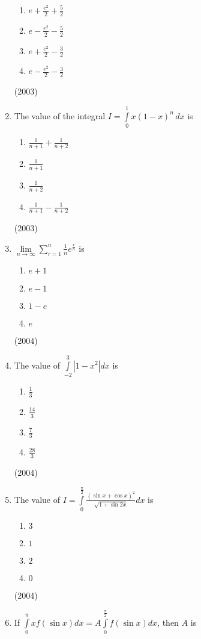 \documentclass[journal,12pt,twocolumn]{IEEEtran}
\theoremstyle{remark}
\begin{document}
\begin{enumerate}
			\begin {enumerate}
				\item $e+ \frac{e^2}{2} + \frac{5}{2}$
				\item $e- \frac{e^2}{2} - \frac{5}{2}$
				\item $e+ \frac{e^2}{2} - \frac{3}{2}$
				\item $e- \frac{e^2}{2} - \frac{3}{2}$
			\end {enumerate}
			\hfill (2003)
	\item
		The value of the integral $I = \int \limits_0^1 x(1-x)^n \, dx$ is
			\begin{enumerate}
				\item $\frac{1}{n+1} + \frac{1}{n+2}$
				\item $\frac{1}{n+1}$
				\item $\frac{1}{n+2}$
				\item $\frac{1}{n+1} - \frac{1}{n+2}$
			\end{enumerate}
			\hfill (2003)
	\item
		$\lim \limits_{n \to \infty} \sum \limits_{r=1}^{n} \frac{1}{n} e^{\frac{r}{n}}$ is
			\begin{enumerate}
				\item $e+1$
				\item $e-1$
				\item $1-e$
				\item $e$	
			\end{enumerate}
			\hfill (2004)
	\item 
		The value of $\int \limits_{-2}^{3} |1-x^2|dx$ is 
			\begin{enumerate}
				\item $\frac{1}{3}$
				\item $\frac{14}{3}$
				\item $\frac{7}{3}$
				\item $\frac{28}{3}$
			\end{enumerate}
			\hfill (2004)
	\item
		The value of $I = \int \limits_0^{\frac{\pi}{2}} \frac{(\sin x + \cos x)^2}{\sqrt{1+ \sin 2x}} dx$ is
			\begin{enumerate}
				\item $3$
				\item $1$
				\item $2$
				\item $0$
			\end{enumerate}
			\hfill (2004)
	\item
		If $\int \limits_{0}^{\pi} x f(\sin x)dx = A \int \limits_{0}^{\frac{\pi}{2}} f(\sin x)dx$, then $A$ is 

\end{enumerate}
\end{document}
